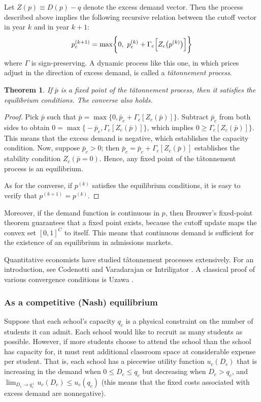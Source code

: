 \documentclass[12pt]{article}
\newtheorem{theorem}{Theorem}
\theoremstyle{definition}
\begin{document}
Let $Z(p) \equiv D(p) - q$ denote the excess demand vector. Then the process described above implies the following recursive relation between the cutoff vector in year $k$ and in year $k+1$:
\[p_c^{(k+1)} = \max\biggl\{0,~p_c^{(k)}+ \Gamma_c\Bigl[Z_c\bigl(p^{(k)}\bigr)\Bigr] \biggr\}\]
where $\Gamma$ is sign-preserving. A dynamic process like this one, in which prices adjust in the direction of excess demand, is called a \emph{t\^{a}tonnement process}.
\begin{theorem}
If $\bar p$ is a fixed point of the t\^{a}tonnement process, then it satisfies the equilibrium conditions. The converse also holds.
\end{theorem}
\begin{proof} Pick $\bar p$ such that $\bar p = \max\bigl\{0, \bar p_c + \Gamma_c\left[Z_c(\bar p)\right] \bigr\}$. Subtract $\bar p_c$ from both sides to obtain $0 = \max\bigl\{-\bar p_c,\Gamma_c\left[Z_c(\bar p)\right] \bigr\}$, which implies $0 \geq \Gamma_c\left[Z_c(\bar p)\right] \bigr\}$. This means that the excess demand is negative, which establishes the capacity condition. Now, suppose $\bar p_c > 0$; then $\bar p_c =  \bar p_c + \Gamma_c\left[Z_c(\bar p)\right] $ establishes the stability condition $Z_c(\bar p = 0)$. Hence, any fixed point of the t\^{a}tonnement process is an equilibrium. 

As for the converse, if $p^{(k)}$ satisfies the equilibrium conditions, it is easy to verify that $p^{(k+1)} = p^{(k)}$. \end{proof}

Moreover, if the demand function is continuous in $p$, then Brouwer's fixed-point theorem guarantees that a fixed point exists, because the cutoff update maps the convex set $[0, 1]^C$ to itself. This means that continuous demand is sufficient for the existence of an equilibrium in admissions markets. 

Quantitative economists have studied t\^{a}tonnement processes extensively. For an introduction, see Codenotti and Varadarajan \parencite*{compmkteq} or Intriligator \parencite*[][chap. 9]{mathematicaloptandecontheory}. A classical proof of various convergence conditions is Uzawa \parencite*{walrastatonnement}. 

\subsubsection{As a competitive (Nash) equilibrium}
Suppose that each school's capacity $q_c$ is a physical constraint on the number of students it can admit. Each school would like to recruit as many students as possible. However, if more students choose to attend the school than the school has capacity for, it must rent additional classroom space at considerable expense per student. That is, each school has a piecewise utility function $u_c(D_c)$ that is increasing in the demand when $0 \leq D_c \leq q_c$ but decreasing when $D_c > q_c$, and $\lim_{D_c \to q_c^+} u_c(D_c) \leq u_c(q_c)$ (this means that the fixed costs associated with excess demand are nonnegative).
\end{document}
